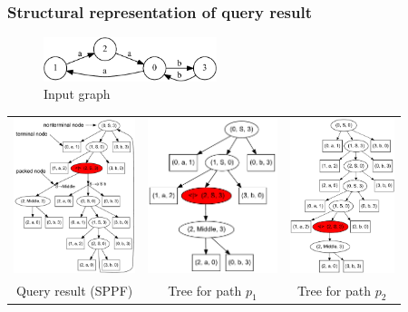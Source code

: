 \documentclass[xcolor=table,aspectratio=169]{beamer}
\begin{document}
\begin{frame}[fragile]
  \transwipe[direction=90]
  \frametitle{Structural representation of query result}
\vspace{-0.3cm}
\begin{figure}[ht]
    \centering
        \includegraphics[width=0.45\textwidth]{pictures/input.pdf} \\
        Input graph
\end{figure}
\vspace{-0.2cm}
\begin{center}
\begin{tabular}{  c  c  c  }
      \includegraphics[height=4.5cm]{pictures/AnBn.pdf}
    &
      \includegraphics[height=4.5cm]{pictures/AnBn_2.pdf}
    &
      \includegraphics[height=4.5cm]{pictures/AnBn_1.pdf}

\\
\small{Query result (SPPF)}
& \small{Tree for path $p_1$}
& \small{Tree for path $p_2$}
  \end{tabular}
\end{center}                
\end{frame}
\end{document}
